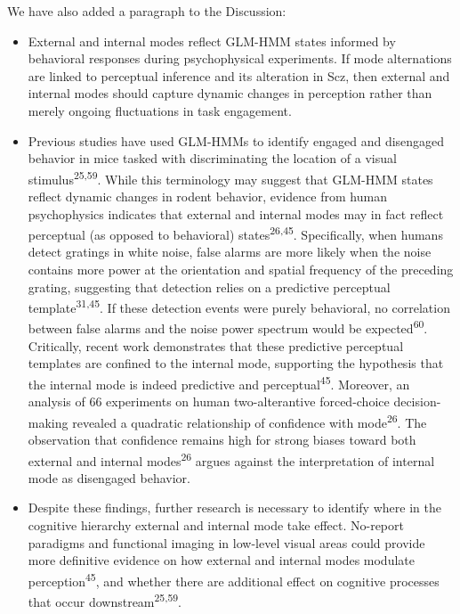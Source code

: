 \documentclass[
]{article}
\begin{document}
We have also added a paragraph to the Discussion:

\begin{itemize}
\item
  External and internal modes reflect GLM-HMM states informed by
  behavioral responses during psychophysical experiments. If mode
  alternations are linked to perceptual inference and its alteration in
  Scz, then external and internal modes should capture dynamic changes
  in perception rather than merely ongoing fluctuations in task
  engagement.
\item
  Previous studies have used GLM-HMMs to identify engaged and disengaged
  behavior in mice tasked with discriminating the location of a visual
  stimulus\textsuperscript{25,59}. While this terminology may suggest
  that GLM-HMM states reflect dynamic changes in rodent behavior,
  evidence from human psychophysics indicates that external and internal
  modes may in fact reflect perceptual (as opposed to behavioral)
  states\textsuperscript{26,45}. Specifically, when humans detect
  gratings in white noise, false alarms are more likely when the noise
  contains more power at the orientation and spatial frequency of the
  preceding grating, suggesting that detection relies on a predictive
  perceptual template\textsuperscript{31,45}. If these detection events
  were purely behavioral, no correlation between false alarms and the
  noise power spectrum would be expected\textsuperscript{60}.
  Critically, recent work demonstrates that these predictive perceptual
  templates are confined to the internal mode, supporting the hypothesis
  that the internal mode is indeed predictive and
  perceptual\textsuperscript{45}. Moreover, an analysis of 66
  experiments on human two-alterantive forced-choice decision-making
  revealed a quadratic relationship of confidence with
  mode\textsuperscript{26}. The observation that confidence remains high
  for strong biases toward both external and internal
  modes\textsuperscript{26} argues against the interpretation of
  internal mode as disengaged behavior.
\item
  Despite these findings, further research is necessary to identify
  where in the cognitive hierarchy external and internal mode take
  effect. No-report paradigms and functional imaging in low-level visual
  areas could provide more definitive evidence on how external and
  internal modes modulate perception\textsuperscript{45}, and whether
  there are additional effect on cognitive processes that occur
  downstream\textsuperscript{25,59}.
\end{itemize}
\end{document}
